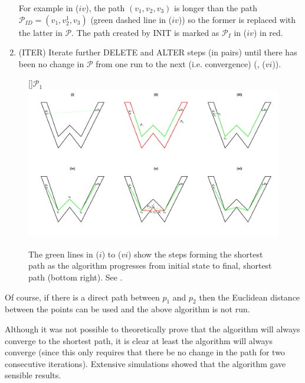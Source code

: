 \begin{enumerate}
For example in  ($iv$), the path $(v_1, v_2, v_3)$ is longer than the path $\mathcal{P}_{ID}=(v_1, v^1_2, v_3)$ (green dashed line in ($iv$)) so the former is replaced with the latter in $\mathcal{P}$. The path created by INIT is marked as $\mathcal{P}_{I}$ in  ($iv$) in red.

\item (ITER) Iterate further DELETE and ALTER steps (in pairs) until there has been no change in $\mathcal{P}$ from one run to the next (i.e. convergence) (, ($vi$)).
\end{enumerate}

\begin{figure}
[]{$\mathcal{P}_1$}
\includegraphics[trim=0in 0.5in 0in 0.25in, width=9.5in]{mds/figs/wdia.pdf} \\
\caption{The green lines in ($i$) to ($vi$) show the steps forming the shortest path as the algorithm progresses from initial state to final, shortest path (bottom right). See .}
\label{wdia}
\end{figure}

Of course, if there is a direct path between $p_1$ and $p_2$ then the Euclidean distance between the points can be used and the above algorithm is not run.

Although it was not possible to theoretically prove that the algorithm will always converge to the shortest path, it is clear at least the algorithm will always converge (since this only requires that there be no change in the path for two consecutive iterations). Extensive simulations showed that the algorithm gave sensible results.

